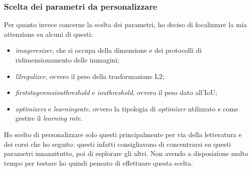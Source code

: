         \subsubsection{Scelta dei parametri da personalizzare}
        Per quanto invece concerne la scelta dei parametri, ho deciso di focalizzare la mia attenzione su alcuni di questi:
        \begin{itemize}
            \item \textit{image\textunderscore resizer}, che si occupa della dimensione e dei protocolli di ridimensionamento delle immagini;
            \item \textit{l2\textunderscore regulizer}, ovvero il peso della trasformazione L2\cite{site:l2-reg};
            \item \textit{first\textunderscore stage\textunderscore nms\textunderscore iou\textunderscore threshold} e \textit{iou\textunderscore threshold}, ovvero il peso dato all'IoU;
            \item \textit{optimizers} e \textit{learning\textunderscore rate}, ovvero la tipologia di \textit{optimizer}\cite{site:type_optimizers} utilizzato e come gestire il \textit{learning rate}.
        \end{itemize}
        Ho scelto di personalizzare solo questi principalmente per via della letteratura e dei corsi che ho seguito: questi infatti consigliavano di concentrarsi su questi parametri innanzitutto, poi di esplorare gli altri. Non avendo a disposizione molto tempo per testare ho quindi pensato di effettuare questa scelta.
        
